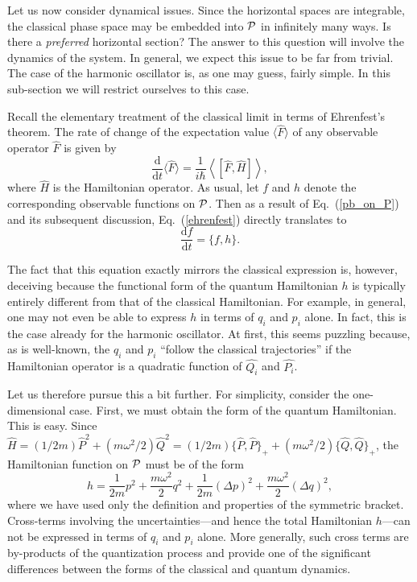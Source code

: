 \documentclass[12pt,aps,eqsecnum,tighten]{revtex4-2}
\def\be{\begin{equation}}
\def\ee{\end{equation}}
\def\<{\langle}
\def\>{\rangle}
\def\d{{\mathrm d}}
\def\i{{i}}
\def\P{{\cal P}}
\def\w{\omega}
\newcommand{\eqn}[1]{Eq.~(\ref{#1})}
\begin{document}
Let us now consider dynamical issues.  Since the horizontal spaces are
integrable, the classical phase space may be embedded into $\P$ in
infinitely many ways.  Is there a {\em preferred} horizontal section?
The answer to this question will involve the dynamics of the system.
In general, we expect this issue to be far from trivial.  The case of
the harmonic oscillator is, as one may guess, fairly simple. In this
sub-section we will restrict ourselves to this case. 

Recall the elementary treatment of the classical limit in terms of
Ehrenfest's theorem.  The rate of change of the expectation value
$\< \hat{F} \>$ of any observable operator $\hat{F}$ is given by
%
\be \label{ehrenfest}
\frac{\d}{\d t} \< \hat{F} \> = \frac{1}{\i\hbar} 
\left<\left[ \hat{F}, \hat{H} \right] \right>,
\ee
%
where $\hat{H}$ is the Hamiltonian operator.  As usual, let $f$ and
$h$ denote the corresponding observable functions on $\P$.  Then as a
result of \eqn{pb_on_P} and its subsequent discussion, \eqn{ehrenfest}
directly translates to
%
\be
	\frac{\d f}{\d t} = \{ f, h \}.
\ee
%

The fact that this equation exactly mirrors the classical expression
is, however, deceiving because the functional form of the quantum
Hamiltonian $h$ is typically entirely different from that of the
classical Hamiltonian.  For example, in general, one may not even be
able to express $h$ in terms of $q_i$ and $p_i$ alone. In fact, this
is the case already for the harmonic oscillator. At first, this seems
puzzling because, as is well-known, the $q_i$ and $p_i$ ``follow the
classical trajectories'' if the Hamiltonian operator is a quadratic
function of $\hat{Q_i}$ and $\hat{P_i}$.

Let us therefore pursue this a bit further. For simplicity,
consider the one-dimensional case.  First, we must obtain the form of
the quantum Hamiltonian.  This is easy.  Since $ \hat{H} = (1 /
2m)\hat{P}^2 + (m\w^2 / 2)\hat{Q}^2 = (1 / 2m) \{ \hat{P}, \hat{P}
\}_+ + (m\w^2 / 2) \{ \hat{Q}, \hat{Q} \}_+$, the Hamiltonian function
on $\P$ must be of the form
%
\be h = \frac{1}{2m}p^2 + \frac{m\w^2}{2}q^2 +
\frac{1}{2m}(\Delta p)^2 + \frac{m\w^2}{2}(\Delta q)^2, \ee 
%
where we have used only the definition and properties of the symmetric
bracket.  Cross-terms involving the uncertainties---and hence the
total Hamiltonian $h$---can not be expressed in terms of $q_i$ and
$p_i$ alone. More generally, such cross terms are by-products of the
quantization process and provide one of the significant differences
between the forms of the classical and quantum dynamics.
\end{document}
